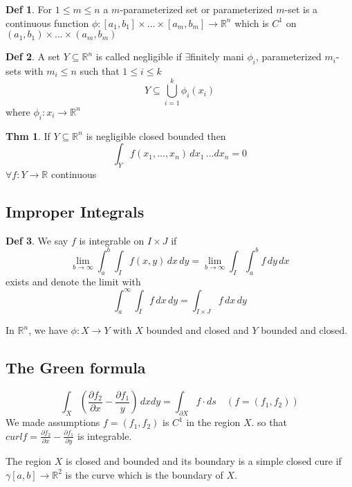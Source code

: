 \documentclass[a4paper, 10pt]{article}
\theoremstyle{definition}
\newtheorem*{theorem}{Thm}
\newtheorem*{definition}{Def}
\newcommand{\R}{\mathbb{R}}
\begin{document}
\begin{definition}
    For \(1 \leq m \leq n\) a \(m\)-parameterized set or parameterized \(m\)-set is a continuous function \(\phi: [a_1, b_1] \times \ldots \times [a_m, b_m] \to \R^n\) which is \(C^1\) on \((a_1, b_1) \times \ldots \times (a_m, b_m)\)
\end{definition}

\begin{definition}
    A set \(Y \subseteq \R^n\) is called negligible if \(\exists\)finitely mani \(\phi_i\), parameterized \(m_i\)-sets with \(m_i \leq n\) such that \(1 \leq i \leq k\)
    \[Y \subseteq \bigcup_{i = 1}^k \phi_i(x_i)\]
    where \(\phi_i: x_i \to \R^n\)
\end{definition}

\begin{theorem}
    If \(Y \subseteq \R^n\) is negligible closed bounded then
    \[\int_Y f(x_1, \ldots, x_n) \, dx_1 \, \ldots dx_n = 0\]
    \(\forall f: Y \to \R\) continuous
\end{theorem}

\subsection*{Improper Integrals}
\begin{definition}
    We say \(f\) is integrable on \(I \times J\) if
    \[\lim_{b \to \infty} \int_a^b \int_I f(x, y) \,dx \,dy = \lim_{b \to \infty} \int_I \int_a^b f \, dy \, dx\]
    exists and denote the limit with
    \[\int_a^\infty \int_I f \,dx \,dy = \int_{I \times J} f \,dx \,dy\]
\end{definition}

\begin{ntheorem*}
    In \(\R^n\), we have \(\phi: X \to Y\) with \(X\) bounded and closed and \(Y\) bounded and closed.
\end{ntheorem*}

\subsection*{The Green formula}

\begin{ntheorem*}
    \[\int_X (\frac{\partial f_2}{\partial x} - \frac{\partial f_1}{y}) \, dx dy = \int_{\partial X} f \cdot ds \quad (f = (f_1, f_2))\]
    We made assumptions \(f = (f_1, f_2)\) is \(C^1\) in the region \(X\). so that \(curl f = \frac{\partial f_2}{\partial x } - \frac{\partial f_1}{\partial y}\) is integrable.

    \noindent The region \(X\) is closed and bounded and its boundary is a simple closed cure if \(\gamma[a, b] \to \R^2\) is the curve which is the boundary of \(X\).
\end{ntheorem*}
\end{document}
